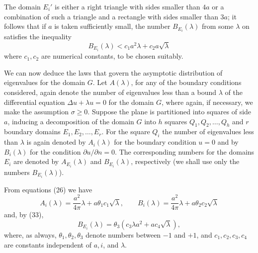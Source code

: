 The domain $E_i'$ is either a right triangle with sides smaller than $4a$ or a combination of such a triangle and a rectangle with sides smaller than $3a$; it follows that if $a$ is taken sufficiently small, the number $B_{E_i}(\lambda)$ from some $\lambda$ on satisfies the inequality
\begin{equation}\tag{33}
B_{E_i}(\lambda)<c_1a^2\lambda+c_2a\sqrt\lambda
\end{equation}
where $c_1,c_2$ are numerical constants, to be chosen suitably.

We can now deduce the laws that govern the asymptotic distribution of eigenvalues for the domain $G$. Let $A(\lambda)$, for any of the boundary conditions considered, again denote the number of eigenvalues less than a bound $\lambda$ of the differential equation $\Delta u+\lambda u=0$ for the domain $G$, where again, if necessary, we make the assumption $\sigma\ge0$. Suppose the plane is partitioned into squares of side $a$, inducing a decomposition of the domain $G$ into $h$ squares $Q_1,Q_2,\ldots,Q_h$ and $r$ boundary domains $E_1,E_2,\ldots,E_r$. For the square $Q_i$ the number of eigenvalues less than $\lambda$ is again denoted by $A_i(\lambda)$ for the boundary condition $u=0$ and by $B_i(\lambda)$ for the condition $\partial u/\partial n=0$. The corresponding numbers for the domains $E_i$ are denoted by $A_{E_i}(\lambda)$ and $B_{E_i}(\lambda)$, respectively (we shall use only the numbers $B_{E_i}(\lambda)$).

From equations (26) we have
\[
A_i(\lambda)=\frac{a^2}{4\pi}\lambda+a\theta_1c_1\sqrt\lambda,
\qquad
B_i(\lambda)=\frac{a^2}{4\pi}\lambda+a\theta_2c_2\sqrt\lambda
\]
and, by (33),
\[
B_{E_i}(\lambda)=\theta_3(c_3\lambda a^2+ac_4\sqrt\lambda),
\]
where, as always, $\theta_1,\theta_2,\theta_3$ denote numbers between $-1$ and $+1$, and $c_1,c_2,c_3,c_4$ are constants independent of $a,i$, and $\lambda$.

